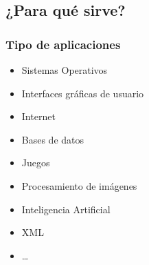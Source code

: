 \documentclass{beamer}
\newtheorem{definicion}[theorem]{Definición}
\begin{document}
%


\subsection{¿Para qué sirve?}
\begin{frame}
  \frametitle{Tipo de aplicaciones}
  \begin{itemize}[<+->]
    \item
      Sistemas Operativos
    \item
      Interfaces gráficas de usuario
    \item
      Internet
    \item
      Bases de datos
    \item
      Juegos
    \item
      Procesamiento de imágenes
    \item
      Inteligencia Artificial
    \item
      XML
    \item
      \ldots
  \end{itemize}
\end{frame}
\end{document}
